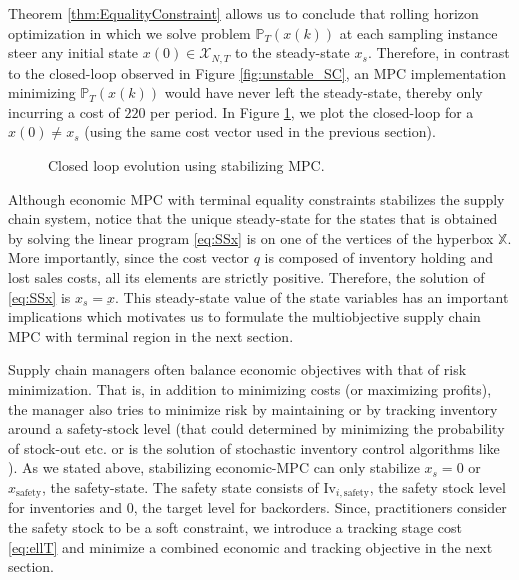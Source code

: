 \documentclass[10pt]{article}
\newcommand{\Inv}{\textrm{Iv}}
\theoremstyle{definition}
\begin{document}
Theorem \ref{thm:EqualityConstraint} allows us to conclude that
rolling horizon optimization in which we solve problem
$\mathbb{P}_T(x(k))$ at each sampling instance steer any initial state
$x(0) \in \mathcal{X}_{N,T}$ to the steady-state $x_s$. Therefore, in
contrast to the closed-loop observed in Figure \ref{fig:unstable_SC},
an MPC implementation minimizing $\mathbb{P}_T(x(k))$ would have never
left the steady-state, thereby only incurring a cost of $220$ per
period. In Figure \ref{fig:stable_SC}, we plot the closed-loop for a
$x(0) \neq x_s$ (using the same cost vector used in the previous
section).

\begin{figure}
\centering
\scriptsize
\resizebox{\textwidth}{!}{}
\caption{Closed loop evolution using stabilizing MPC.}
\label{fig:stable_SC}
\end{figure}


Although economic MPC with terminal equality constraints stabilizes
the supply chain system, notice that the unique steady-state for the
states that is obtained by solving the linear program \eqref{eq:SSx}
is on one of the vertices of the hyperbox $\mathbb{X}$. More
importantly, since the cost vector $q$ is composed of inventory
holding and lost sales costs, all its elements are strictly
positive. Therefore, the solution of \eqref{eq:SSx} is $x_s =
\underbar{x}$. This steady-state value of the state variables has
an important implications which motivates us to formulate the
multiobjective supply chain MPC with terminal region in the next
section.

Supply chain managers often balance economic objectives with that of
risk minimization. That is, in addition to minimizing costs (or
maximizing profits), the manager also tries to minimize risk by
maintaining or by tracking inventory around a  safety-stock level
(that could determined by minimizing the probability of stock-out
etc. or is the solution of stochastic inventory control algorithms
like \citet{federgruen:1993, shang:song:2003, dong:lee:2003,
  gallego:ozer:2005,chen:song:2001}). As we stated above, stabilizing
economic-MPC can only stabilize $x_s = 0$ or $x_{\text{safety}}$, the
  safety-state. The safety state consists of $\Inv_{i,\text{safety}}$,
  the safety stock level for inventories and $0$, the target level for
  backorders. Since, practitioners consider the safety stock to be a
  soft constraint, we introduce a tracking stage cost \eqref{eq:ellT}
  and minimize a combined economic and tracking objective in the next section.
\end{document}
